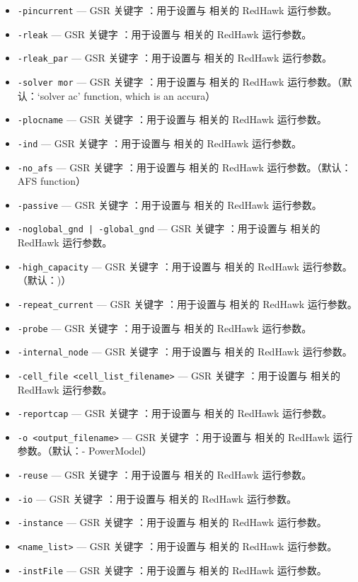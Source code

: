 \begin{itemize}
\item \texttt{-pincurrent} — GSR 关键字 ：用于设置与  相关的 RedHawk 运行参数。
\item \texttt{-rleak} — GSR 关键字 ：用于设置与  相关的 RedHawk 运行参数。
\item \texttt{-rleak\_par} — GSR 关键字 ：用于设置与  相关的 RedHawk 运行参数。
\item \texttt{-solver mor} — GSR 关键字 ：用于设置与  相关的 RedHawk 运行参数。（默认：‘solver ac’ function, which is an accura）
\item \texttt{-plocname} — GSR 关键字 ：用于设置与  相关的 RedHawk 运行参数。
\item \texttt{-ind} — GSR 关键字 ：用于设置与  相关的 RedHawk 运行参数。
\item \texttt{-no\_afs} — GSR 关键字 ：用于设置与  相关的 RedHawk 运行参数。（默认：AFS function）
\item \texttt{-passive} — GSR 关键字 ：用于设置与  相关的 RedHawk 运行参数。
\item \texttt{-noglobal\_gnd | -global\_gnd} — GSR 关键字 ：用于设置与  相关的 RedHawk 运行参数。
\item \texttt{-high\_capacity} — GSR 关键字 ：用于设置与  相关的 RedHawk 运行参数。（默认：)）
\item \texttt{-repeat\_current} — GSR 关键字 ：用于设置与  相关的 RedHawk 运行参数。
\item \texttt{-probe} — GSR 关键字 ：用于设置与  相关的 RedHawk 运行参数。
\item \texttt{-internal\_node} — GSR 关键字 ：用于设置与  相关的 RedHawk 运行参数。
\item \texttt{-cell\_file <cell\_list\_filename>} — GSR 关键字 ：用于设置与  相关的 RedHawk 运行参数。
\item \texttt{-reportcap} — GSR 关键字 ：用于设置与  相关的 RedHawk 运行参数。
\item \texttt{-o <output\_filename>} — GSR 关键字 ：用于设置与  相关的 RedHawk 运行参数。（默认：- PowerModel）
\item \texttt{-reuse} — GSR 关键字 ：用于设置与  相关的 RedHawk 运行参数。
\item \texttt{-io} — GSR 关键字 ：用于设置与  相关的 RedHawk 运行参数。
\item \texttt{-instance} — GSR 关键字 ：用于设置与  相关的 RedHawk 运行参数。
\item \texttt{<name\_list>} — GSR 关键字 ：用于设置与  相关的 RedHawk 运行参数。
\item \texttt{-instFile} — GSR 关键字 ：用于设置与  相关的 RedHawk 运行参数。

\end{itemize}

